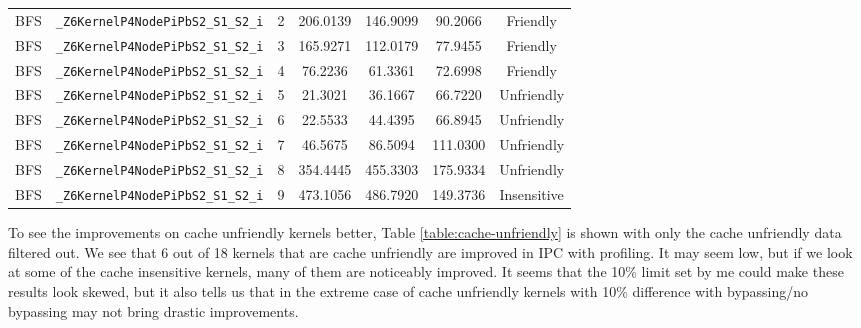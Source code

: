 \documentclass{article}
\begin{document}
\begin{table}[H]
\begin{tabular}{c c c c c c c}
BFS & \verb|_Z6KernelP4NodePiPbS2_S1_S2_i|           & 2  & 206.0139  & 146.9099 &  90.2066  & Friendly\\
BFS & \verb|_Z6KernelP4NodePiPbS2_S1_S2_i|           & 3  & 165.9271  & 112.0179 &  77.9455  & Friendly\\
BFS & \verb|_Z6KernelP4NodePiPbS2_S1_S2_i|           & 4  & 76.2236   & 61.3361  &  72.6998  & Friendly\\
BFS & \verb|_Z6KernelP4NodePiPbS2_S1_S2_i|           & 5  & 21.3021   & 36.1667  &  66.7220  & Unfriendly\\
BFS & \verb|_Z6KernelP4NodePiPbS2_S1_S2_i|           & 6  & 22.5533   & 44.4395  &  66.8945  & Unfriendly\\
BFS & \verb|_Z6KernelP4NodePiPbS2_S1_S2_i|           & 7  & 46.5675   & 86.5094  & 111.0300  & Unfriendly\\
BFS & \verb|_Z6KernelP4NodePiPbS2_S1_S2_i|           & 8  & 354.4445  & 455.3303 & 175.9334  & Unfriendly\\
BFS & \verb|_Z6KernelP4NodePiPbS2_S1_S2_i|           & 9  & 473.1056  & 486.7920 & 149.3736  & Insensitive\\
[1ex] %
\hline %
\end{tabular}
\label{table:cache-profile} %
\end{table}

To see the improvements on cache unfriendly kernels better, Table \ref{table:cache-unfriendly} is shown with only the cache unfriendly data filtered out. We see that 6 out of 18 kernels that are cache unfriendly are improved in IPC with profiling. It may seem low, but if we look at some of the cache insensitive kernels, many of them are noticeably improved. It seems that the 10\% limit set by me could make these results look skewed, but it also tells us that in the extreme case of cache unfriendly kernels with 10\% difference with bypassing/no bypassing may not bring drastic improvements. 
\end{document}
